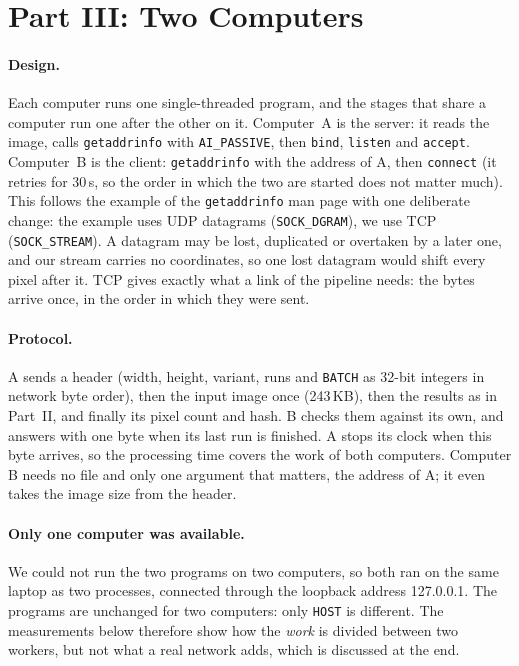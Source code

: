 \documentclass[11pt,a4paper]{article}
\begin{document}
\section{Part III: Two Computers}
\label{sec:part3}

\paragraph{Design.} Each computer runs one single-threaded program, and the stages that share a
computer run one after the other on it. Computer~A is the server: it reads the image, calls
\texttt{getaddrinfo} with \texttt{AI\_PASSIVE}, then \texttt{bind}, \texttt{listen} and
\texttt{accept}. Computer~B is the client: \texttt{getaddrinfo} with the address of A, then
\texttt{connect} (it retries for 30\,s, so the order in which the two are started does not matter
much). This follows the example of the \texttt{getaddrinfo} man page with one deliberate change:
the example uses UDP datagrams (\texttt{SOCK\_DGRAM}), we use TCP (\texttt{SOCK\_STREAM}). A
datagram may be lost, duplicated or overtaken by a later one, and our stream carries no
coordinates, so one lost datagram would shift every pixel after it. TCP gives exactly what a link
of the pipeline needs: the bytes arrive once, in the order in which they were sent.

\paragraph{Protocol.} A sends a header (width, height, variant, runs and \texttt{BATCH} as 32-bit
integers in network byte order), then the input image once (243\,KB), then the results as in
Part~II, and finally its pixel count and hash. B checks them against its own, and answers with one
byte when its last run is finished. A stops its clock when this byte arrives, so the processing
time covers the work of both computers. Computer B needs no file and only one argument that
matters, the address of A; it even takes the image size from the header.

\paragraph{Only one computer was available.} We could not run the two programs on two computers,
so both ran on the same laptop as two processes, connected through the loopback address 127.0.0.1.
The programs are unchanged for two computers: only \texttt{HOST} is different. The measurements
below therefore show how the \emph{work} is divided between two workers, but not what a real network
adds, which is discussed at the end.
\end{document}
